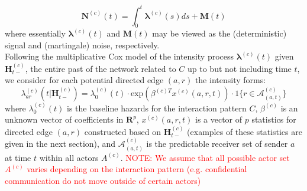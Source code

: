 \documentclass[a4paper]{article}
\begin{document}
\begin{equation}
\mathbf{N}^{(c)}(t)=\int_0^t\boldsymbol{\lambda}^{(c)}(s)ds + \mathbf{M}(t)
\end{equation}
where essentially $\boldsymbol{\lambda}^{(c)}(t)$ and $\mathbf{M}(t)$ may be viewed as the (deterministic) signal and (martingale) noise, respectively.\\ \newline
Following the multiplicative Cox model of the intensity process $\boldsymbol{\lambda}^{(c)}(t)$ given $\boldsymbol{H}^{(c)}_{t-}$, the entire past of the network related to $C$ up to but not including time $t$, we consider for each potential directed edge $(a, r)$ the intensity forms:
\begin{equation}
 \lambda^{(c)}_{ar}(t|\boldsymbol{H}^{(c)}_{t-})=\lambda^{(c)}_0(t)\cdot \mbox{exp}(\beta^{(c)T}x^{(c)}(a, r, t))\cdot 1\{r \in \mathcal{A}^{(c)}_{(a, t)}\}
\end{equation}
where $\lambda_0^{(c)}(t)$ is the baseline hazards for the interaction pattern $C$, $\beta^{(c)}$ is an unknown vector of coefficients in $\boldsymbol{R}^{p}$, $x^{(c)}(a, r, t)$ is a vector of $p$ statistics for directed edge $(a, r)$ constructed based on
$\boldsymbol{H}^{(c)}_{t-}$ (examples of these statistics are given in the next section), and $\mathcal{A}^{(c)}_{(a, t)}$ is the predictable receiver set of sender $a$ at time $t$ within all actors $A^{(c)}$. \textcolor{red}{NOTE: We assume that all possible actor set $A^{(c)}$ varies depending on the interaction pattern (e.g. confidential communication do not move outside of certain actors) }
\end{document}
